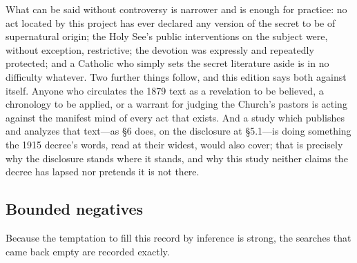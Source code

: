 What can be said without controversy is narrower and is enough for
practice: no act located by this project has ever declared any
version of the secret to be of supernatural origin; the Holy See's
public interventions on the subject were, without exception,
restrictive; the devotion was expressly and repeatedly protected;
and a Catholic who simply sets the secret literature aside is in no
difficulty whatever. Two further things follow, and this edition
says both against itself. Anyone who circulates the 1879 text as a
revelation to be believed, a chronology to be applied, or a warrant
for judging the Church's pastors is acting against the manifest mind
of every act that exists. And a study which publishes and analyzes
that text---as \S6 does, on the disclosure at \S5.1---is doing
something the 1915 decree's words, read at their widest, would also
cover; that is precisely why the disclosure stands where it stands,
and why this study neither claims the decree has lapsed nor pretends
it is not there.

\subsection{Bounded negatives}

Because the temptation to fill this record by inference is strong,
the searches that came back empty are recorded
exactly.

